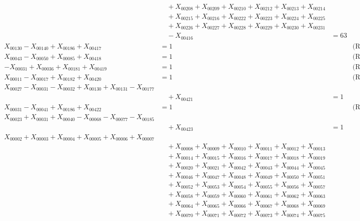 \documentclass[a4paper,10pt]{article}
\begin{document}
{\begin{align}
&\quad  + X_{00208} + X_{00209} + X_{00210} + X_{00212} + X_{00213} + X_{00214} \\[0.5ex]
&\quad  + X_{00215} + X_{00216} + X_{00222} + X_{00223} + X_{00224} + X_{00225} \\[0.5ex]
&\quad  + X_{00226} + X_{00227} + X_{00228} + X_{00229} + X_{00230} + X_{00231} \\[0.5ex]
&\quad  - X_{00416} &= 63 && \text{(R00185)} \\
X_{00130} - X_{00140} + X_{00186} + X_{00417} &= 1 && \text{(R00186)} \\
X_{00043} - X_{00050} + X_{00085} + X_{00418} &= 1 && \text{(R00187)} \\
-X_{00031} + X_{00036} + X_{00181} + X_{00419} &= 1 && \text{(R00188)} \\
X_{00011} - X_{00017} + X_{00182} + X_{00420} &= 1 && \text{(R00189)} \\
X_{00027} - X_{00031} - X_{00032} + X_{00130} + X_{00131} - X_{00177} \\[0.5ex]
&\quad  + X_{00421} &= 1 && \text{(R00190)} \\
X_{00031} - X_{00041} + X_{00186} + X_{00422} &= 1 && \text{(R00191)} \\
X_{00023} + X_{00031} + X_{00040} - X_{00068} - X_{00077} - X_{00185} \\[0.5ex]
&\quad  + X_{00423} &= 1 && \text{(R00192)} \\
X_{00002} + X_{00003} + X_{00004} + X_{00005} + X_{00006} + X_{00007} \\[0.5ex]
&\quad  + X_{00008} + X_{00009} + X_{00010} + X_{00011} + X_{00012} + X_{00013} \\[0.5ex]
&\quad  + X_{00014} + X_{00015} + X_{00016} + X_{00017} + X_{00018} + X_{00019} \\[0.5ex]
&\quad  + X_{00020} + X_{00021} + X_{00042} + X_{00043} + X_{00044} + X_{00045} \\[0.5ex]
&\quad  + X_{00046} + X_{00047} + X_{00048} + X_{00049} + X_{00050} + X_{00051} \\[0.5ex]
&\quad  + X_{00052} + X_{00053} + X_{00054} + X_{00055} + X_{00056} + X_{00057} \\[0.5ex]
&\quad  + X_{00058} + X_{00059} + X_{00060} + X_{00061} + X_{00062} + X_{00063} \\[0.5ex]
&\quad  + X_{00064} + X_{00065} + X_{00066} + X_{00067} + X_{00068} + X_{00069} \\[0.5ex]
&\quad  + X_{00070} + X_{00071} + X_{00072} + X_{00073} + X_{00074} + X_{00075} \\[0.5ex]

\end{align}}
\end{document}

